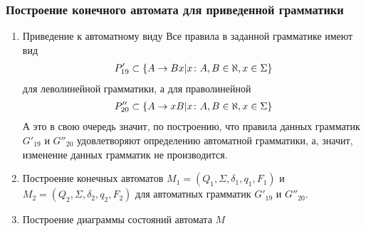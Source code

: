 \subsubsection{Построение конечного автомата для приведенной грамматики}
\begin{enumerate}
	\item Приведение к автоматному виду
	      Все правила в заданной грамматике имеют вид
	      \begin{align*}
		      P'_{19} \subset \left\{A\to Bx|x \colon A, B \in \aleph, x \in \Sigma\right\}
	      \end{align*}
	      для леволинейной грамматики, а для праволинейной
	      \begin{align*}
		      P''_{20} \subset \left\{A\to xB|x \colon A, B \in \aleph, x \in \Sigma\right\}
	      \end{align*}
	      А это в свою очередь значит, по построению, что правила данных грамматик \(G'_{19}\) и \(G''_{20}\) удовлетворяют определению автоматной грамматики, а, значит, изменение данных грамматик не производится.
	\item Построение конечных автоматов \(M_1 = (Q_1, \Sigma, \delta_1, q_1, F_1)\) и \(M_2 = (Q_2, \Sigma, \delta_2, q_2, F_2)\) для автоматных грамматик \(G'_{19}\) и \(G''_{20}\).
	      
	\item Построение диаграммы состояний автомата \(M\)
	      
\end{enumerate}

